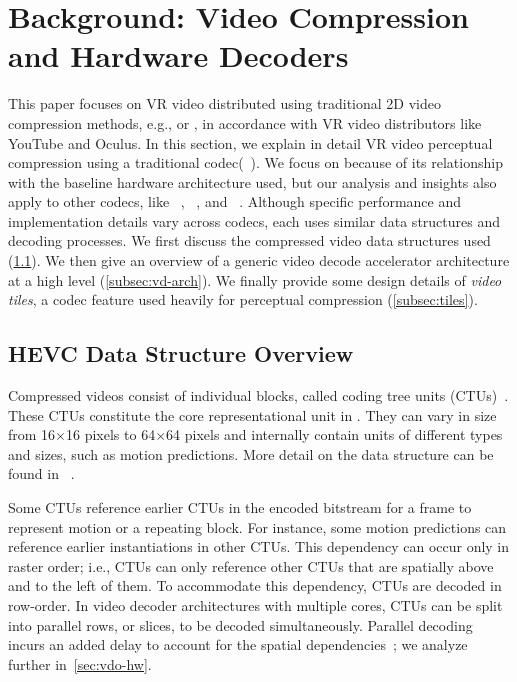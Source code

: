 \section{Background: Video Compression and Hardware Decoders}
\vdecBaselineArchFigure

This paper focuses on VR video distributed using traditional 2D video compression methods, e.g., \hevc or \vpnine, in accordance with VR video distributors like YouTube and Oculus.
In this section, we explain in detail VR video perceptual compression using a traditional codec(\hevc~\cite{hevc}).
We focus on \hevc because of its relationship with the baseline hardware architecture used, but our analysis and insights also apply to other codecs, like \vpnine~\cite{mukherjee2015technical}, \avc~\cite{h264spec}, and \avone~\cite{avone}.
Although specific performance and implementation details vary across codecs, each uses similar data structures and decoding processes.
We first discuss the compressed video data structures used (\ref{subsec:hevc}).
We then give an overview of a generic video decode accelerator architecture at a high level (\ref{subsec:vd-arch}).
We finally provide some design details of \emph{video tiles}, a codec feature used heavily for perceptual compression (\ref{subsec:tiles}).

\subsection{HEVC Data Structure Overview}
\label{subsec:hevc}

Compressed \hevc videos consist of individual blocks, called coding tree units (CTUs)~\cite{hevc}.
These CTUs constitute the core representational unit in \hevc.
They can vary in size from 16$\times$16 pixels to 64$\times$64 pixels and internally contain units of different types and sizes, such as motion predictions.
More detail on the \hevc data structure can be found in ~\cite{hevc}.

Some CTUs reference earlier CTUs in the encoded bitstream for a frame to represent motion or a repeating block.
For instance, some motion predictions can reference earlier instantiations in other CTUs.
This dependency can occur only in raster order; i.e., CTUs can only reference other CTUs that are spatially above and to the left of them.
To accommodate this dependency, CTUs are decoded in row-order.
In video decoder architectures with multiple cores, CTUs can be split into parallel rows, or slices, to be decoded simultaneously.
Parallel decoding incurs an added delay to account for the spatial dependencies~\cite{hevcThesis}; we analyze further in~\ref{sec:vdo-hw}.

